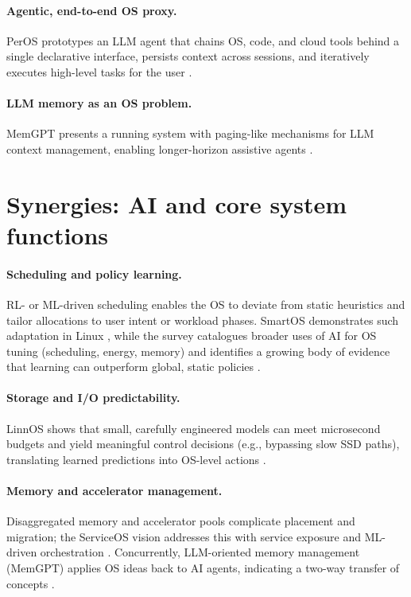 \documentclass{article}
\begin{document}
\paragraph{Agentic, end-to-end OS proxy.}
PerOS prototypes an LLM agent that chains OS, code, and cloud tools behind a single declarative interface, persists context across sessions, and iteratively executes high-level tasks for the user \cite{he2024peros}. %

\paragraph{LLM memory as an OS problem.}
MemGPT presents a running system with paging-like mechanisms for LLM context management, enabling longer-horizon assistive agents \cite{packer2023memgpt}. %

\section{Synergies: AI and core system functions}
\paragraph{Scheduling and policy learning.}
RL- or ML-driven scheduling enables the OS to deviate from static heuristics and tailor allocations to user intent or workload phases. SmartOS demonstrates such adaptation in Linux \cite{goodarzy2021smartos}, while the survey catalogues broader uses of AI for OS tuning (scheduling, energy, memory) and identifies a growing body of evidence that learning can outperform global, static policies \cite{zhang2024systematic}. %

\paragraph{Storage and I/O predictability.}
LinnOS shows that small, carefully engineered models can meet microsecond budgets and yield meaningful control decisions (e.g., bypassing slow SSD paths), translating learned predictions into OS-level actions \cite{hao2020linnos}. %

\paragraph{Memory and accelerator management.}
Disaggregated memory and accelerator pools complicate placement and migration; the ServiceOS vision addresses this with service exposure and ML-driven orchestration \cite{liu2021serviceos}. %
Concurrently, LLM-oriented memory management (MemGPT) applies OS ideas back to AI agents, indicating a two-way transfer of concepts \cite{packer2023memgpt}. %
\end{document}
